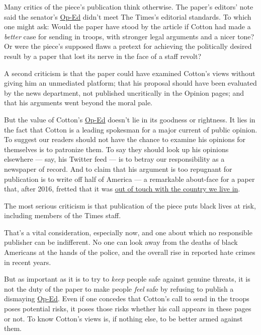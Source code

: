 Many critics of the piece's publication think otherwise. The paper's
editors' note said the senator's
\href{https://www.nytimes.com/2020/06/03/opinion/tom-cotton-protests-military.html}{Op-Ed}
didn't meet The Times's editorial standards. To which one might ask:
Would the paper have stood by the article if Cotton had made a
\emph{better} case for sending in troops, with stronger legal arguments
and a nicer tone? Or were the piece's supposed flaws a pretext for
achieving the politically desired result by a paper that lost its nerve
in the face of a staff revolt?

A second criticism is that the paper could have examined Cotton's views
without giving him an unmediated platform; that his proposal should have
been evaluated by the news department, not published uncritically in the
Opinion pages; and that his arguments went beyond the moral pale.

But the value of Cotton's
\href{https://www.nytimes.com/2020/06/03/opinion/tom-cotton-protests-military.html}{Op-Ed}
doesn't lie in its goodness or rightness. It lies in the fact that
Cotton is a leading spokesman for a major current of public opinion. To
suggest our readers should not have the chance to examine his opinions
for themselves is to patronize them. To say they should look up his
opinions elsewhere --- say, his Twitter feed --- is to betray our
responsibility as a newspaper of record. And to claim that his argument
is too repugnant for publication is to write off half of America --- a
remarkable about-face for a paper that, after 2016, fretted that it was
\href{https://www.nytimes.com/2020/01/31/podcasts/the-daily/2020-election.html}{out
of touch with the country we live in}.

The most serious criticism is that publication of the piece puts black
lives at risk, including members of the Times staff.

That's a vital consideration, especially now, and one about which no
responsible publisher can be indifferent. No one can look away from the
deaths of black Americans at the hands of the police, and the overall
rise in reported hate crimes in recent years.

But as important as it is to try to \emph{keep} people safe against
genuine threats, it is not the duty of the paper to make people
\emph{feel} safe by refusing to publish a dismaying
\href{https://www.nytimes.com/2020/06/03/opinion/tom-cotton-protests-military.html}{Op-Ed}.
Even if one concedes that Cotton's call to send in the troops poses
potential risks, it poses those risks whether his call appears in these
pages or not. To know Cotton's views is, if nothing else, to be better
armed against them.

